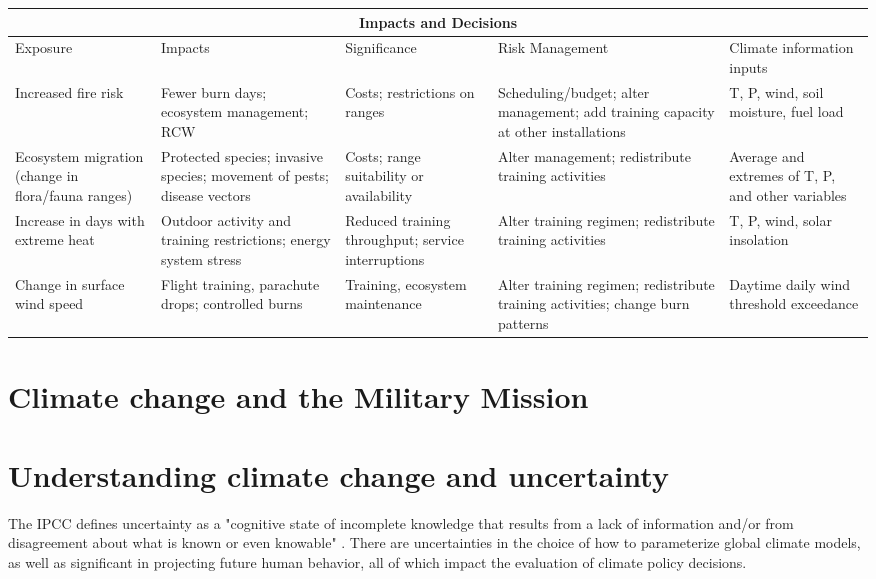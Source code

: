 \documentclass[10pt]{amsart}
\begin{document}
\begin{tabular}{ |p{2.5cm}|p{2.5cm}|p{2.5cm}|p{2.5cm}|p{2.5cm}| }
\hline
\multicolumn{5}{|c|}{Impacts and Decisions} \\
\hline
Exposure & Impacts & Significance & Risk Management & Climate information inputs \\
\hline
Increased fire risk & Fewer burn days; ecosystem management; RCW & Costs; restrictions on ranges & Scheduling/budget; alter management; add training capacity at other installations & T, P, wind, soil moisture, fuel load \\
\hline
Ecosystem migration (change in flora/fauna ranges) & Protected species; invasive species; movement of pests; disease vectors & Costs; range suitability or availability & Alter management; redistribute training activities & Average and extremes of T, P, and other variables \\
\hline
Increase in days with extreme heat & Outdoor activity and training restrictions; energy system stress & Reduced training throughput; service interruptions & Alter training regimen; redistribute training activities & T, P, wind, solar insolation \\
\hline
Change in surface wind speed & Flight training, parachute drops; controlled burns & Training, ecosystem maintenance & Alter training regimen; redistribute training activities; change burn patterns & Daytime daily wind threshold exceedance \\
\hline
\end{tabular}

\section{Climate change and the Military Mission}
\section{Understanding climate change and uncertainty}

The IPCC defines uncertainty as a "cognitive state of incomplete knowledge that results from a lack of information and/or from disagreement about what is known or even knowable" \parencite{kunreuther2014integrated}.
There are uncertainties in the choice of how to parameterize global climate models, as well as significant in projecting future human behavior, all of which impact the evaluation of climate policy decisions.
\end{document}
